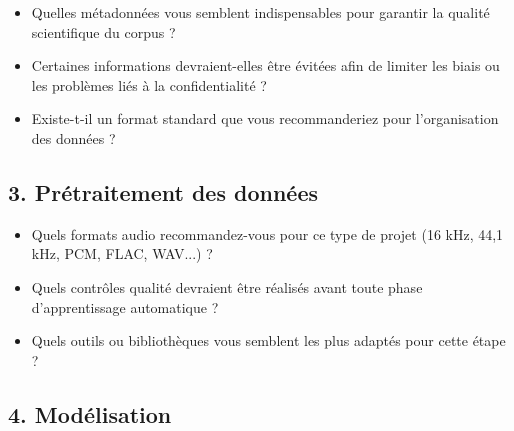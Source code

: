 \begin{discussion}

\begin{itemize}

\item Quelles métadonnées vous semblent indispensables pour garantir la
qualité scientifique du corpus ?

\item Certaines informations devraient-elles être évitées afin de limiter
les biais ou les problèmes liés à la confidentialité ?

\item Existe-t-il un format standard que vous recommanderiez pour
l'organisation des données ?

\end{itemize}

\end{discussion}


\subsection{3. Prétraitement des données}

\begin{discussion}

\begin{itemize}

\item Quels formats audio recommandez-vous pour ce type de projet
(16 kHz, 44,1 kHz, PCM, FLAC, WAV...) ?

\item Quels contrôles qualité devraient être réalisés avant toute phase
d'apprentissage automatique ?

\item Quels outils ou bibliothèques vous semblent les plus adaptés pour
cette étape ?

\end{itemize}

\end{discussion}


\subsection{4. Modélisation}

